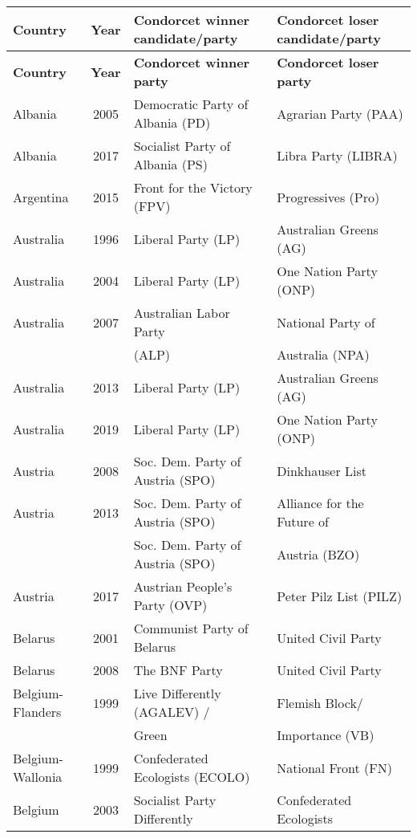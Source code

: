 \scriptsize{
\begin{longtable}{|l|c|l|l|} \toprule 
	\textbf{Country} & \textbf{Year} & \textbf{Condorcet winner candidate/party} & \textbf{Condorcet loser candidate/party} \\ \midrule 	\endfirsthead	\midrule
\textbf{Country} & \textbf{Year} & \textbf{Condorcet winner party} & \textbf{Condorcet loser party} \\		\midrule \endhead \midrule \endfoot \bottomrule
\endlastfoot \midrule
Albania & 2005 &   Democratic Party of Albania (PD) &   Agrarian Party (PAA) \\ 
  Albania & 2017 &   Socialist Party of Albania (PS) &   Libra Party (LIBRA) \\ 
%
Argentina & 2015 &   Front for the Victory (FPV) &   Progressives (Pro) \\ 
%
Australia & 1996 &   Liberal Party (LP) &    Australian Greens (AG) \\ 
Australia & 2004 &   Liberal Party (LP) &   One Nation Party (ONP) \\ 
Australia & 2007 &   Australian Labor Party  &   National Party of     \\ 
      &  &     (ALP)  &     Australia (NPA)   \\ 
Australia & 2013 &   Liberal Party (LP) &   Australian Greens (AG) \\ 
Australia & 2019 &   Liberal Party (LP) &   One Nation Party (ONP) \\ 
%
Austria & 2008 &   Soc. Dem. Party of Austria (SPO) &   Dinkhauser List  \\ 
Austria & 2013 &   Soc. Dem. Party of Austria (SPO) &   Alliance for the Future of   \\ 
    &  &   Soc. Dem. Party of Austria (SPO) &     Austria (BZO) \\ 
Austria & 2017 &   Austrian People's Party (OVP)   &   Peter Pilz List (PILZ) \\ 
%
Belarus & 2001 &   Communist Party of Belarus  &   United Civil Party  \\ 
Belarus & 2008 &   The BNF Party  &   United Civil Party  \\  
%
Belgium-Flanders & 1999 & Live Differently (AGALEV)  /  &  Flemish Block/ \\ 
   &   &   Green  &   Importance (VB)\\ 
Belgium-Wallonia & 1999 & Confederated Ecologists (ECOLO)   &  National Front (FN)   \\ 
  Belgium & 2003 &   Socialist Party Differently   &   Confederated Ecologists   \\ 

\end{longtable}}
